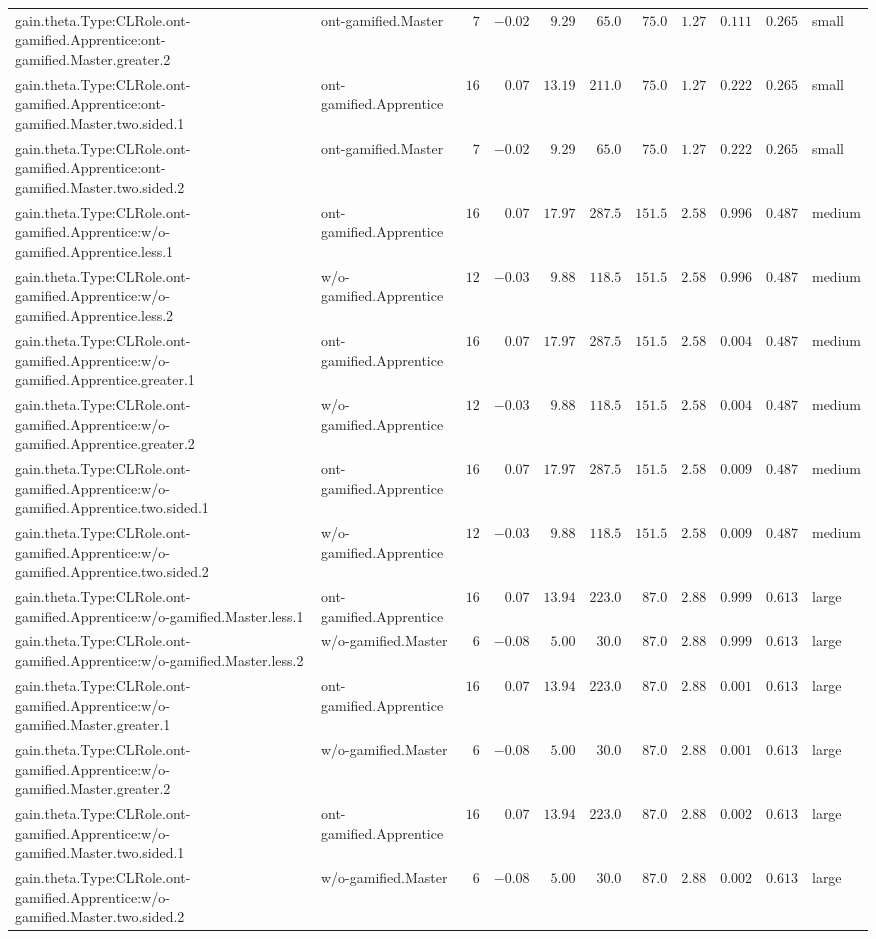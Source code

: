 \documentclass[6pt]{article}
\begin{document}
\begin{landscape}
{\begin{longtable}{llrrrrrrrrl}
gain.theta.Type:CLRole.ont-gamified.Apprentice:ont-gamified.Master.greater.2&ont-gamified.Master&$ 7$&$-0.02$&$ 9.29$&$ 65.0$&$ 75.0$&$1.27$&$0.111$&$0.265$&small\tabularnewline
gain.theta.Type:CLRole.ont-gamified.Apprentice:ont-gamified.Master.two.sided.1&ont-gamified.Apprentice&$16$&$ 0.07$&$13.19$&$211.0$&$ 75.0$&$1.27$&$0.222$&$0.265$&small\tabularnewline
gain.theta.Type:CLRole.ont-gamified.Apprentice:ont-gamified.Master.two.sided.2&ont-gamified.Master&$ 7$&$-0.02$&$ 9.29$&$ 65.0$&$ 75.0$&$1.27$&$0.222$&$0.265$&small\tabularnewline
gain.theta.Type:CLRole.ont-gamified.Apprentice:w/o-gamified.Apprentice.less.1&ont-gamified.Apprentice&$16$&$ 0.07$&$17.97$&$287.5$&$151.5$&$2.58$&$0.996$&$0.487$&medium\tabularnewline
gain.theta.Type:CLRole.ont-gamified.Apprentice:w/o-gamified.Apprentice.less.2&w/o-gamified.Apprentice&$12$&$-0.03$&$ 9.88$&$118.5$&$151.5$&$2.58$&$0.996$&$0.487$&medium\tabularnewline
gain.theta.Type:CLRole.ont-gamified.Apprentice:w/o-gamified.Apprentice.greater.1&ont-gamified.Apprentice&$16$&$ 0.07$&$17.97$&$287.5$&$151.5$&$2.58$&$0.004$&$0.487$&medium\tabularnewline
gain.theta.Type:CLRole.ont-gamified.Apprentice:w/o-gamified.Apprentice.greater.2&w/o-gamified.Apprentice&$12$&$-0.03$&$ 9.88$&$118.5$&$151.5$&$2.58$&$0.004$&$0.487$&medium\tabularnewline
gain.theta.Type:CLRole.ont-gamified.Apprentice:w/o-gamified.Apprentice.two.sided.1&ont-gamified.Apprentice&$16$&$ 0.07$&$17.97$&$287.5$&$151.5$&$2.58$&$0.009$&$0.487$&medium\tabularnewline
gain.theta.Type:CLRole.ont-gamified.Apprentice:w/o-gamified.Apprentice.two.sided.2&w/o-gamified.Apprentice&$12$&$-0.03$&$ 9.88$&$118.5$&$151.5$&$2.58$&$0.009$&$0.487$&medium\tabularnewline
gain.theta.Type:CLRole.ont-gamified.Apprentice:w/o-gamified.Master.less.1&ont-gamified.Apprentice&$16$&$ 0.07$&$13.94$&$223.0$&$ 87.0$&$2.88$&$0.999$&$0.613$&large\tabularnewline
gain.theta.Type:CLRole.ont-gamified.Apprentice:w/o-gamified.Master.less.2&w/o-gamified.Master&$ 6$&$-0.08$&$ 5.00$&$ 30.0$&$ 87.0$&$2.88$&$0.999$&$0.613$&large\tabularnewline
gain.theta.Type:CLRole.ont-gamified.Apprentice:w/o-gamified.Master.greater.1&ont-gamified.Apprentice&$16$&$ 0.07$&$13.94$&$223.0$&$ 87.0$&$2.88$&$0.001$&$0.613$&large\tabularnewline
gain.theta.Type:CLRole.ont-gamified.Apprentice:w/o-gamified.Master.greater.2&w/o-gamified.Master&$ 6$&$-0.08$&$ 5.00$&$ 30.0$&$ 87.0$&$2.88$&$0.001$&$0.613$&large\tabularnewline
gain.theta.Type:CLRole.ont-gamified.Apprentice:w/o-gamified.Master.two.sided.1&ont-gamified.Apprentice&$16$&$ 0.07$&$13.94$&$223.0$&$ 87.0$&$2.88$&$0.002$&$0.613$&large\tabularnewline
gain.theta.Type:CLRole.ont-gamified.Apprentice:w/o-gamified.Master.two.sided.2&w/o-gamified.Master&$ 6$&$-0.08$&$ 5.00$&$ 30.0$&$ 87.0$&$2.88$&$0.002$&$0.613$&large\tabularnewline

\end{longtable}}
\end{landscape}
\end{document}
